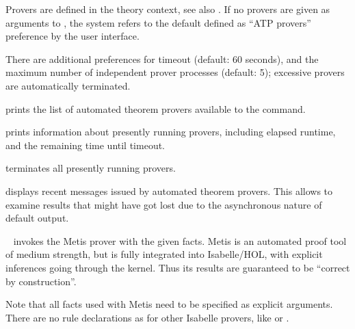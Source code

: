 \begin{isabellebody}
\begin{isamarkuptext}
\begin{description}
  Provers are defined in the theory context, see also \hyperlink{command.HOL.print-atps}{\mbox{}}.  If no provers are given as arguments to \hyperlink{command.HOL.sledgehammer}{\mbox{}}, the system refers to the default defined as
  ``ATP provers'' preference by the user interface.

  There are additional preferences for timeout (default: 60 seconds),
  and the maximum number of independent prover processes (default: 5);
  excessive provers are automatically terminated.

  \item \hyperlink{command.HOL.print-atps}{\mbox{}} prints the list of automated
  theorem provers available to the \hyperlink{command.HOL.sledgehammer}{\mbox{}}
  command.

  \item \hyperlink{command.HOL.atp-info}{\mbox{}} prints information about presently
  running provers, including elapsed runtime, and the remaining time
  until timeout.

  \item \hyperlink{command.HOL.atp-kill}{\mbox{}} terminates all presently running
  provers.

  \item \hyperlink{command.HOL.atp-messages}{\mbox{}} displays recent messages issued
  by automated theorem provers.  This allows to examine results that
  might have got lost due to the asynchronous nature of default
  \hyperlink{command.HOL.sledgehammer}{\mbox{}} output.

  \item \hyperlink{method.HOL.metis}{\mbox{}}~ invokes the Metis prover
  with the given facts.  Metis is an automated proof tool of medium
  strength, but is fully integrated into Isabelle/HOL, with explicit
  inferences going through the kernel.  Thus its results are
  guaranteed to be ``correct by construction''.

  Note that all facts used with Metis need to be specified as explicit
  arguments.  There are no rule declarations as for other Isabelle
  provers, like \hyperlink{method.blast}{\mbox{}} or \hyperlink{method.fast}{\mbox{}}.


\end{description}
\end{isamarkuptext}
\end{isabellebody}
